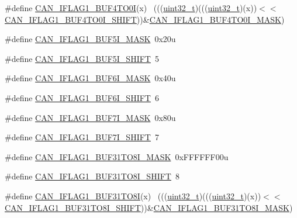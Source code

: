 \begin{DoxyCompactItemize}
\item 
\#define \hyperlink{group___c_a_n___register___masks_ga381897dc01d35c267b9203dc1e3a2de3}{C\+A\+N\+\_\+\+I\+F\+L\+A\+G1\+\_\+\+B\+U\+F4\+T\+O0I}(x)                                  ~(((\hyperlink{_p_e___types_8h_a33594304e786b158f3fb30289278f5af}{uint32\+\_\+t})(((\hyperlink{_p_e___types_8h_a33594304e786b158f3fb30289278f5af}{uint32\+\_\+t})(x))$<$$<$\hyperlink{group___c_a_n___register___masks_gac55369b6f357dd331ed5c9557eeddb40}{C\+A\+N\+\_\+\+I\+F\+L\+A\+G1\+\_\+\+B\+U\+F4\+T\+O0\+I\+\_\+\+S\+H\+I\+FT}))\&\hyperlink{group___c_a_n___register___masks_ga7cae7a414b6cbda0bfd1750a793ef044}{C\+A\+N\+\_\+\+I\+F\+L\+A\+G1\+\_\+\+B\+U\+F4\+T\+O0\+I\+\_\+\+M\+A\+SK})
\item 
\#define \hyperlink{group___c_a_n___register___masks_ga5ba2a22d90a915a0504e74e0be2ae46e}{C\+A\+N\+\_\+\+I\+F\+L\+A\+G1\+\_\+\+B\+U\+F5\+I\+\_\+\+M\+A\+SK}~0x20u
\item 
\#define \hyperlink{group___c_a_n___register___masks_ga4eef45eb97993797f0e4d25d84ae98ae}{C\+A\+N\+\_\+\+I\+F\+L\+A\+G1\+\_\+\+B\+U\+F5\+I\+\_\+\+S\+H\+I\+FT}~5
\item 
\#define \hyperlink{group___c_a_n___register___masks_ga0aec3c62d96f6f8e8afd046065838df7}{C\+A\+N\+\_\+\+I\+F\+L\+A\+G1\+\_\+\+B\+U\+F6\+I\+\_\+\+M\+A\+SK}~0x40u
\item 
\#define \hyperlink{group___c_a_n___register___masks_gac3a088607f853fdddfc0011293e1c336}{C\+A\+N\+\_\+\+I\+F\+L\+A\+G1\+\_\+\+B\+U\+F6\+I\+\_\+\+S\+H\+I\+FT}~6
\item 
\#define \hyperlink{group___c_a_n___register___masks_gacc148d0c9e26a80f08110dc2c5045809}{C\+A\+N\+\_\+\+I\+F\+L\+A\+G1\+\_\+\+B\+U\+F7\+I\+\_\+\+M\+A\+SK}~0x80u
\item 
\#define \hyperlink{group___c_a_n___register___masks_ga327609a9678df5c8c34053d43b550422}{C\+A\+N\+\_\+\+I\+F\+L\+A\+G1\+\_\+\+B\+U\+F7\+I\+\_\+\+S\+H\+I\+FT}~7
\item 
\#define \hyperlink{group___c_a_n___register___masks_ga70c705b79c7bd7451ebdee6bc0ba6f1c}{C\+A\+N\+\_\+\+I\+F\+L\+A\+G1\+\_\+\+B\+U\+F31\+T\+O8\+I\+\_\+\+M\+A\+SK}~0x\+F\+F\+F\+F\+F\+F00u
\item 
\#define \hyperlink{group___c_a_n___register___masks_gaeb0d9f42c855b318796736ab6cc2de75}{C\+A\+N\+\_\+\+I\+F\+L\+A\+G1\+\_\+\+B\+U\+F31\+T\+O8\+I\+\_\+\+S\+H\+I\+FT}~8
\item 
\#define \hyperlink{group___c_a_n___register___masks_ga4355b6ce0f94c35f6a96ad4ad4165502}{C\+A\+N\+\_\+\+I\+F\+L\+A\+G1\+\_\+\+B\+U\+F31\+T\+O8I}(x)                                ~(((\hyperlink{_p_e___types_8h_a33594304e786b158f3fb30289278f5af}{uint32\+\_\+t})(((\hyperlink{_p_e___types_8h_a33594304e786b158f3fb30289278f5af}{uint32\+\_\+t})(x))$<$$<$\hyperlink{group___c_a_n___register___masks_gaeb0d9f42c855b318796736ab6cc2de75}{C\+A\+N\+\_\+\+I\+F\+L\+A\+G1\+\_\+\+B\+U\+F31\+T\+O8\+I\+\_\+\+S\+H\+I\+FT}))\&\hyperlink{group___c_a_n___register___masks_ga70c705b79c7bd7451ebdee6bc0ba6f1c}{C\+A\+N\+\_\+\+I\+F\+L\+A\+G1\+\_\+\+B\+U\+F31\+T\+O8\+I\+\_\+\+M\+A\+SK})

\end{DoxyCompactItemize}
